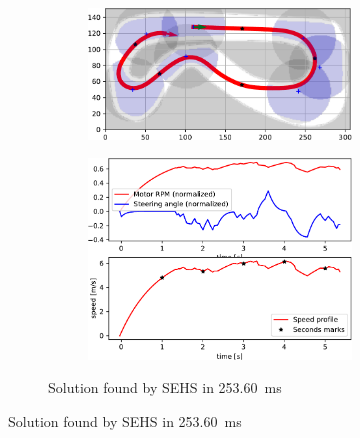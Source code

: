 \begin{figure}[!tbp]
	\begin{subfigure}[t]{\textwidth}
		\begin{subfigure}[t]{0.45\textwidth}
			\includegraphics[width=\textwidth]{../img/experiments/porto-sehs-trajectory}
		\end{subfigure}
		\hfill
		\begin{subfigure}[t]{0.45\textwidth}
			\includegraphics[width=\textwidth]{../img/experiments/porto-sehs-actuators}
		\end{subfigure}
		\caption{Solution found by SEHS in \SI{253.60}{\milli\second}}
		\label{fig:solution_porto-sehs}
	\end{subfigure}

	\vspace{0.75cm}


\end{figure}
